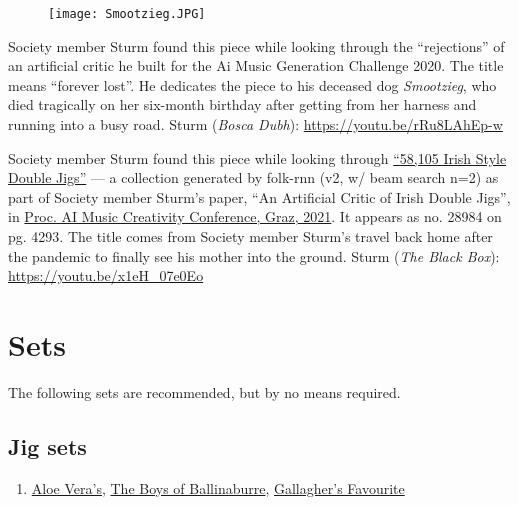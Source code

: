 \documentclass[a4paper,notitlepage,twoside]{book}
\begin{document}
{}  
\hypertarget{piece:EvigtForlorad}{}
\begin{figure}
\vspace{-0.3in}
\texttt{[image: Smootzieg.JPG]}
\end{figure}
Society member Sturm found this piece while looking through
the ``rejections'' of an artificial critic he built for the 
Ai Music Generation Challenge 2020.
The title means ``forever lost''.
He dedicates the piece to his deceased dog {\em Smootzieg},
who died tragically on her six-month birthday after 
getting from her harness and running into a busy road.
Sturm ({\em Bosca Dubh}): \url{https://youtu.be/rRu8LAhEp-w}

\clearpage
{}
{}  
\hypertarget{piece:HeadingHome}{}
Society member Sturm found this piece 
while looking through 
\href{http://urn.kb.se/resolve?urn=urn:nbn:se:kth:diva-296578}{``58,105 Irish Style Double Jigs''} ---
a collection generated by folk-rnn (v2, w/ beam search n=2)
as part of Society member Sturm's paper,
``An Artificial Critic of Irish Double Jigs'', in \href{https://aimc2021.iem.at/program/papers/}{Proc. AI Music Creativity Conference, Graz, 2021}.
It appears as no. 28984 on pg. 4293.
The title comes from Society member Sturm's
travel back home after the pandemic to finally
see his mother into the ground.
Sturm ({\em The Black Box}): \url{https://youtu.be/x1eH_07e0Eo}




\chapter{Sets}
The following sets are recommended, 
but by no means required.

\section{Jig sets}
\begin{enumerate}
\item \hyperlink{jig:AloeVeras}{Aloe Vera's}, \hyperlink{jig:BoysofBallinaburre}{The Boys of Ballinaburre}, \hyperlink{jig:GallaghersFavourite}{Gallagher's Favourite}
\end{enumerate}
\end{document}
